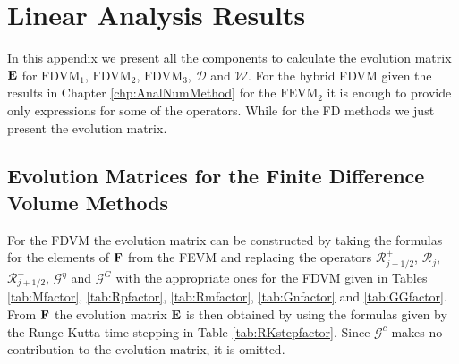\chapter{Linear Analysis Results}
\label{app:LinAnal}
In this appendix we present all the components to calculate the evolution matrix $\mathbf{E}$ for $\text{FDVM}_1$, $\text{FDVM}_2$, $\text{FDVM}_3$, $\mathcal{D}$ and $\mathcal{W}$. For the hybrid FDVM given the results in Chapter \ref{chp:AnalNumMethod} for the $\text{FEVM}_2$ it is enough to provide only expressions for some of the operators. While for the FD methods we just present the evolution matrix.  

\section{Evolution Matrices for the Finite Difference Volume Methods}
For the FDVM the evolution matrix can be constructed by taking the formulas for the elements of $\mathbf{F}$ from the FEVM and replacing the operators $\mathcal{R}^+_{j-1/2}$, $\mathcal{R}_j$, $\mathcal{R}^-_{j+1/2}$, $\mathcal{G}^\eta$ and $\mathcal{G}^G$  with the appropriate ones for the FDVM given in Tables \ref{tab:Mfactor}, \ref{tab:Rpfactor}, \ref{tab:Rmfactor}, \ref{tab:Gnfactor} and \ref{tab:GGfactor}. From $\mathbf{F}$ the evolution matrix $\mathbf{E}$ is then obtained by using the formulas given by the Runge-Kutta time stepping in Table \ref{tab:RKstepfactor}. Since $\mathcal{G}^c$ makes no contribution to the evolution matrix, it is omitted.

